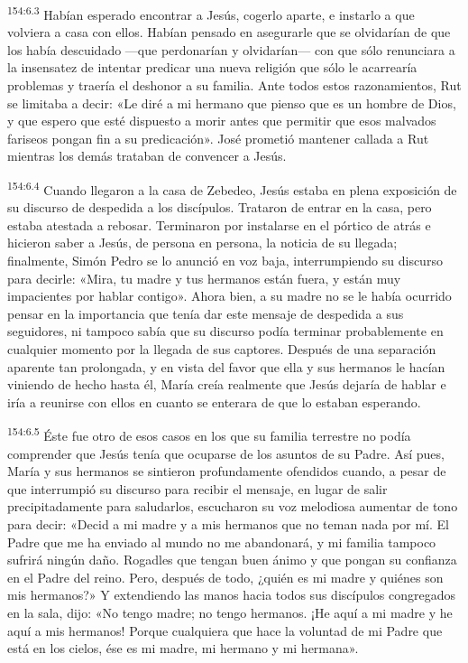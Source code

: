 \par 
\textsuperscript{154:6.3} Habían esperado encontrar a Jesús, cogerlo aparte, e instarlo a que volviera a casa con ellos. Habían pensado en asegurarle que se olvidarían de que los había descuidado ---que perdonarían y olvidarían--- con que sólo renunciara a la insensatez de intentar predicar una nueva religión que sólo le acarrearía problemas y traería el deshonor a su familia. Ante todos estos razonamientos, Rut se limitaba a decir: «Le diré a mi hermano que pienso que es un hombre de Dios, y que espero que esté dispuesto a morir antes que permitir que esos malvados fariseos pongan fin a su predicación». José prometió mantener callada a Rut mientras los demás trataban de convencer a Jesús.

\par 
\textsuperscript{154:6.4} Cuando llegaron a la casa de Zebedeo, Jesús estaba en plena exposición de su discurso de despedida a los discípulos. Trataron de entrar en la casa, pero estaba atestada a rebosar. Terminaron por instalarse en el pórtico de atrás e hicieron saber a Jesús, de persona en persona, la noticia de su llegada; finalmente, Simón Pedro se lo anunció en voz baja, interrumpiendo su discurso para decirle: «Mira, tu madre y tus hermanos están fuera, y están muy impacientes por hablar contigo». Ahora bien, a su madre no se le había ocurrido pensar en la importancia que tenía dar este mensaje de despedida a sus seguidores, ni tampoco sabía que su discurso podía terminar probablemente en cualquier momento por la llegada de sus captores. Después de una separación aparente tan prolongada, y en vista del favor que ella y sus hermanos le hacían viniendo de hecho hasta él, María creía realmente que Jesús dejaría de hablar e iría a reunirse con ellos en cuanto se enterara de que lo estaban esperando.

\par 
\textsuperscript{154:6.5} Éste fue otro de esos casos en los que su familia terrestre no podía comprender que Jesús tenía que ocuparse de los asuntos de su Padre. Así pues, María y sus hermanos se sintieron profundamente ofendidos cuando, a pesar de que interrumpió su discurso para recibir el mensaje, en lugar de salir precipitadamente para saludarlos, escucharon su voz melodiosa aumentar de tono para decir: «Decid a mi madre y a mis hermanos que no teman nada por mí. El Padre que me ha enviado al mundo no me abandonará, y mi familia tampoco sufrirá ningún daño. Rogadles que tengan buen ánimo y que pongan su confianza en el Padre del reino. Pero, después de todo, ¿quién es mi madre y quiénes son mis hermanos?» Y extendiendo las manos hacia todos sus discípulos congregados en la sala, dijo: «No tengo madre; no tengo hermanos. ¡He aquí a mi madre y he aquí a mis hermanos! Porque cualquiera que hace la voluntad de mi Padre que está en los cielos, ése es mi madre, mi hermano y mi hermana».

